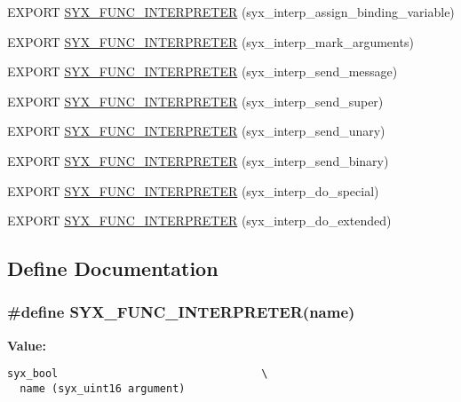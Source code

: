 \begin{CompactItemize}
\item 
EXPORT \hyperlink{syx-interp_8h_292058c552463272423fb34da7219ac0}{SYX\_\-FUNC\_\-INTERPRETER} (syx\_\-interp\_\-assign\_\-binding\_\-variable)
\item 
EXPORT \hyperlink{syx-interp_8h_10ea4850e8d53efc10a3581d8b321e7b}{SYX\_\-FUNC\_\-INTERPRETER} (syx\_\-interp\_\-mark\_\-arguments)
\item 
EXPORT \hyperlink{syx-interp_8h_e716214de5c9198cf24cc79921a6cd0c}{SYX\_\-FUNC\_\-INTERPRETER} (syx\_\-interp\_\-send\_\-message)
\item 
EXPORT \hyperlink{syx-interp_8h_d81f03d5031351e56956a7b979683d88}{SYX\_\-FUNC\_\-INTERPRETER} (syx\_\-interp\_\-send\_\-super)
\item 
EXPORT \hyperlink{syx-interp_8h_f81064b895c3d925f517ccd89f652133}{SYX\_\-FUNC\_\-INTERPRETER} (syx\_\-interp\_\-send\_\-unary)
\item 
EXPORT \hyperlink{syx-interp_8h_bd8a612284c94f636ad4ec6b92a2487f}{SYX\_\-FUNC\_\-INTERPRETER} (syx\_\-interp\_\-send\_\-binary)
\item 
EXPORT \hyperlink{syx-interp_8h_4effe2c2eb7ff02fabba95103cc52529}{SYX\_\-FUNC\_\-INTERPRETER} (syx\_\-interp\_\-do\_\-special)
\item 
EXPORT \hyperlink{syx-interp_8h_50f705244d1caf2f54378f234e9c5b1c}{SYX\_\-FUNC\_\-INTERPRETER} (syx\_\-interp\_\-do\_\-extended)
\end{CompactItemize}


\subsection{Define Documentation}
\hypertarget{syx-interp_8h_c8a67ae79ddd303b4bbdbc71573a5090}{
\subsubsection{\setlength{\rightskip}{0pt plus 5cm}\#define SYX\_\-FUNC\_\-INTERPRETER(name)}}
\label{syx-interp_8h_c8a67ae79ddd303b4bbdbc71573a5090}


\textbf{Value:}

\begin{Code}\begin{verbatim}syx_bool                                \
  name (syx_uint16 argument)
\end{verbatim}
\end{Code}



